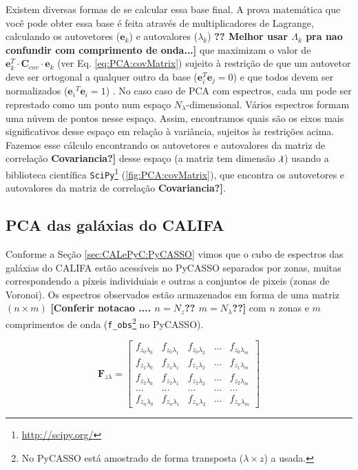 Existem diversas formas de se calcular essa base final. A prova matemática que você pode obter essa base é feita através
de multiplicadores de Lagrange, calculando os autovetores ($\mathbf{e}{}_k$) e autovalores  ($\lambda_k$) {\bf\ojo ??
Melhor usar $\Lambda_k$ pra nao confundir com comprimento de onda...]} que maximizam o valor de $\mathbf{e}{}_k^T \cdot
\mathbf{C}{}_{cov} \cdot \mathbf{e}{}_k$ (ver Eq. \ref{eq:PCA:covMatrix}) sujeito à restrição de que um autovetor deve
ser ortogonal a qualquer outro da base ($\mathbf{e}{}_i^T \mathbf{e}{}_j = 0$) e que todos devem ser normalizados
($\mathbf{e}{}_i{}^T \mathbf{e}{}_i = 1$) \citep[][p. 5-6]{JolliffePCA1986}. No caso caso de PCA com espectros, cada um
pode ser represtado como um ponto num espaço \ojo$N_\lambda$-dimensional. Vários espectros formam uma núvem de pontos
nesse espaço. Assim, encontramos quais são os eixos mais significativos desse espaço em relação à variância, sujeitos às
restrições acima. Fazemos esse cálculo encontrando os autovetores e autovalores da matriz de correlação {\bf \ojo
Covariancia?]} desse espaço (a matriz tem dimensão $\lambda \time \lambda$) usando a biblioteca científica
\texttt{SciPy}\footnote{\url{http://scipy.org/}} (\ref{fig:PCA:covMatrix}), que encontra os autovetores e autovalores da
matriz de correlação {\bf \ojo Covariancia?]}.

\subsection{PCA das galáxias do CALIFA}

Conforme a Seção \ref{sec:CALePyC:PyCASSO} vimos que o cubo de espectros das galáxias do CALIFA estão acessíveis no
PyCASSO separados por zonas, muitas correspondendo a píxeis individuiais e outras a conjuntos de pixeis (zonas de
Voronoi). Os espectros observados estão armazenados em forma de uma matriz $(n \times m)$ {\bf [\ojo Conferir notacao
.... $n = N_z$?? $m = N_\lambda$??]} com $n$ zonas e $m$ comprimentos de onda (\texttt{f\_obs}\footnote{No PyCASSO está
amostrado de forma transposta ($\lambda \times z$) a usada.} no PyCASSO).

\begin{equation}
    \label{eq:PCA:fluxMatrix}
    \textbf{F}{}_{z \lambda} = \left[
    \begin{array}{ccccc}
        f_{z_0 \lambda_0} & f_{z_0 \lambda_1} & f_{z_0 \lambda_2} & ... & f_{z_0 \lambda_m} \\
        f_{z_1 \lambda_0} & f_{z_1 \lambda_1} & f_{z_1 \lambda_2} & ... & f_{z_1 \lambda_m} \\
        f_{z_2 \lambda_0} & f_{z_2 \lambda_1} & f_{z_2 \lambda_2} & ... & f_{z_2 \lambda_m} \\
        ...               & ...               & ...               & ... & ...               \\
        f_{z_n \lambda_0} & f_{z_n \lambda_1} & f_{z_n \lambda_2} & ... & f_{z_n \lambda_m} 
    \end{array} 
    \right]
\end{equation}

